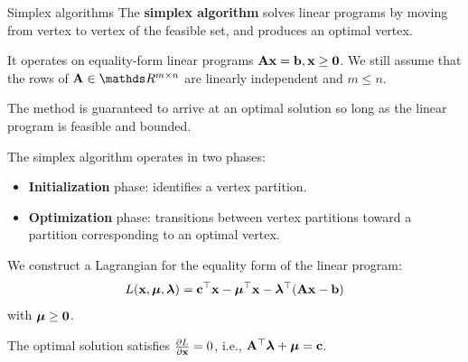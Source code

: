 \documentclass[11pt,compress,t,notes=noshow, xcolor=table]{beamer}
\begin{document}
\begin{vbframe}{Simplex algorithms}
The \textbf{simplex algorithm} solves linear programs by moving from vertex to vertex of the feasible set, 
and produces an optimal vertex.\\

\lz

It operates on equality-form linear programs $\mathbf{A}\mathbf{x} = \mathbf{b}, \mathbf{x} \ge \mathbf{0}$. 
We still assume that the rows of $\Amat \in \R^{m \times n}$ are linearly independent and $m \le n$.\\

\lz

The method is guaranteed to arrive at an optimal solution so long as the linear program is feasible and bounded.\\

\lz

The simplex algorithm operates in two phases:
\begin{itemize}
    \item \textbf{Initialization} phase: identifies a vertex partition.
    \item \textbf{Optimization} phase: transitions between vertex partitions toward a partition corresponding to an optimal vertex.
\end{itemize}

\framebreak

We construct a Lagrangian for the equality form of the linear program:
$$L(\mathbf{x}, \bm{\mu}, \bm{\lambda}) = \mathbf{c}^\top\mathbf{x} - \bm{\mu}^\top\mathbf{x} - \bm{\lambda}^\top(\mathbf{A}\mathbf{x} - \mathbf{b})$$
with $\bm{\mu} \ge \mathbf{0}$.

The optimal solution satisfies $\frac{\partial L}{\partial \mathbf{x}}=0$, i.e., $\mathbf{A}^\top \bm{\lambda} + \bm{\mu} = \mathbf{c}$.



\end{vbframe}
\end{document}
